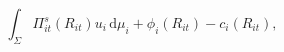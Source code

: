 \begin{equation}\label{eq:EU}
\int_{\Sigma}\!\Pi_{it}^s(R_{it})u_i\,\mathrm d\mu_i+\phi_i(R_{it})-c_{i}(R_{it}),
\end{equation}